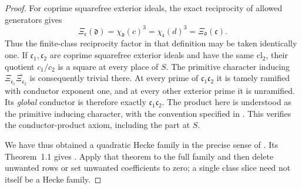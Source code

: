 \begin{proof}
For coprime squarefree exterior ideals, the exact reciprocity of allowed
generators gives
\[
 \Xi_{\mathfrak c}(\mathfrak d)
     =\chi_{\mathfrak d}(c)^3
     =\chi_{\mathfrak c}(d)^3
     =\Xi_{\mathfrak d}(\mathfrak c).
\]
Thus the finite-class reciprocity factor in that definition may be taken
identically one.  If $\mathfrak c_1,\mathfrak c_2$ are coprime squarefree exterior ideals and have the
same $\mathrm{cl}_2$, their quotient $c_1/c_2$ is a square at every place
of $S$.  The primitive character inducing
$\Xi_{\mathfrak c_1}\overline{\Xi_{\mathfrak c_2}}$ is consequently
trivial there.  At every prime of $\mathfrak c_1\mathfrak c_2$ it is tamely
ramified with conductor exponent one, and at every other exterior prime it
is unramified.  Its \emph{global} conductor is therefore exactly
$\mathfrak c_1\mathfrak c_2$.  The product here is understood as the
primitive inducing character, with the convention specified in
\cite[\S2]{GoldmakherLouvel13}.  This verifies the conductor-product axiom,
including the part at $S$.

We have thus obtained a quadratic Hecke family in the precise sense of
\cite[Definition~1]{GoldmakherLouvel13}.  Its Theorem~1.1 gives
.  Apply that theorem to the full
family and then delete unwanted rows or set unwanted coefficients to zero;
a single class slice need not itself be a Hecke family.
\end{proof}

